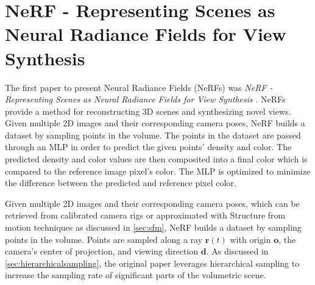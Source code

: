 


\section{NeRF - Representing Scenes as Neural Radiance Fields for View Synthesis} \label{sec:nerf}
The first paper to present Neural Radiance Fields (NeRFs) was \textit{NeRF - Representing Scenes as Neural Radiance Fields for View Synthesis} \cite{mildenhall_nerf_2020}. NeRFs provide a method for reconstructing 3D scenes and synthesizing novel views. Given multiple 2D images and their corresponding camera poses, NeRF builds a dataset by sampling points in the volume. The points in the dataset are passed through an MLP in order to predict the given points' density and color. The predicted density and color values are then composited into a final color which is compared to the reference image pixel's color. The MLP is optimized to minimize the difference between the predicted and reference pixel color.


Given multiple 2D images and their corresponding camera poses, which can be retrieved from calibrated camera rigs or approximated with Structure from motion techniques as discussed in \autoref{sec:sfm}, NeRF builds a dataset by sampling points in the volume. Points are sampled along a ray $\pmb{r}(t)$ with origin $\textbf{o}$, the camera's center of projection, and viewing direction $\textbf{d}$. As discussed in \autoref{sec:hierarchicalsampling}, the original paper leverages hierarchical sampling to increase the sampling rate of significant parts of the volumetric scene.

